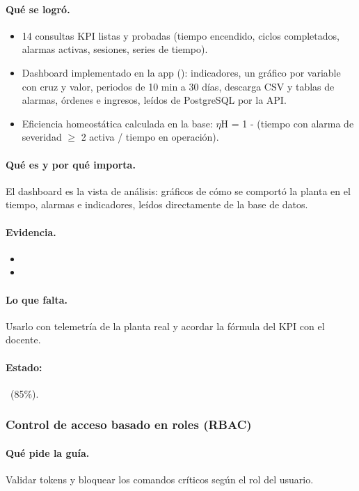 \documentclass[a4paper,11pt]{article}
\begin{document}
\paragraph{Qué se logró.}
\begin{itemize}
\item 14 consultas KPI listas y probadas (tiempo encendido, ciclos completados, alarmas activas, sesiones, series de tiempo).
\item Dashboard implementado en la app (): indicadores, un gráfico por variable con cruz y valor, periodos de 10 min a 30 días, descarga CSV y tablas de alarmas, órdenes e ingresos, leídos de PostgreSQL por la API.
\item Eficiencia homeostática calculada en la base: $\eta$H = 1 - (tiempo con alarma de severidad $\ge$ 2 activa / tiempo en operación).
\end{itemize}
\paragraph{Qué es y por qué importa.} El dashboard es la vista de análisis: gráficos de cómo se comportó la planta en el tiempo, alarmas e indicadores, leídos directamente de la base de datos.
\paragraph{Evidencia.}
\begin{itemize}\small
\item {}
\item {}
\end{itemize}
\paragraph{Lo que falta.} Usarlo con telemetría de la planta real y acordar la fórmula del KPI con el docente.
\paragraph{Estado:} \parcial~(85\%).
\subsubsection{Control de acceso basado en roles (RBAC)}
\paragraph{Qué pide la guía.} Validar tokens y bloquear los comandos críticos según el rol del usuario.
\end{document}

